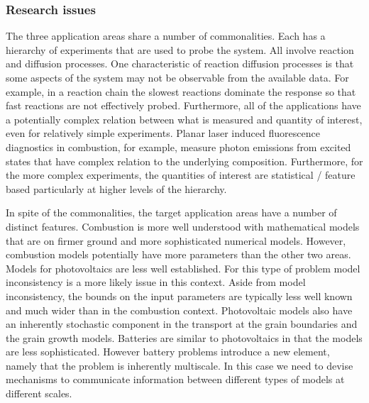 \documentclass[11pt]{article}
\begin{document}
\subsubsection*{Research issues}
The three application areas share a number of commonalities.
Each has a hierarchy of experiments that are used to probe the system.
All involve reaction and diffusion processes.
One characteristic of reaction diffusion processes is that some aspects of the system
may not be observable from the available data. For example, in a reaction chain the slowest
reactions dominate the response so that fast reactions are not effectively probed.
Furthermore, all of the applications
have a potentially complex relation between what is measured and quantity of interest,
even for relatively simple experiments. 
Planar laser induced fluorescence diagnostics in combustion, for example, 
measure photon emissions from excited states that have complex relation to the underlying
composition.
Furthermore, for the more complex experiments, the
quantities of interest are statistical / feature based
particularly at higher levels of the hierarchy.

In spite of the commonalities, the target application areas have a number
of distinct features.
Combustion is more well understood with mathematical models that are on firmer ground
and more sophisticated numerical models.
However, combustion models potentially have more parameters than the other two areas.
Models for photovoltaics are less well established.
For this type of problem 
model inconsistency is a more likely issue in this context.
Aside from model inconsistency, the bounds on the input parameters are typically less well known and much wider than in the combustion context. 
Photovoltaic models also have an inherently stochastic component in the transport at the grain boundaries and the grain growth models.  
Batteries are similar to photovoltaics
in that the models are less sophisticated. However battery problems introduce a 
new element, namely that the problem is inherently multiscale.
In this case we need to devise mechanisms to communicate information
between different types of models at different scales.
\end{document}
